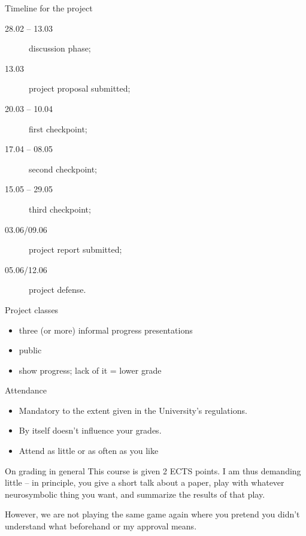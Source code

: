 \documentclass{lecture}
\begin{document}
\begin{frame}{Timeline for the project}
    \begin{description}
        \item[28.02 -- 13.03] discussion phase;
        \item[13.03] project proposal submitted;
        \item[20.03 -- 10.04] first checkpoint;
        \item[17.04 -- 08.05] second checkpoint; 
        \item[15.05 -- 29.05] third checkpoint;
        \item[03.06/09.06] project report submitted;
        \item[05.06/12.06] project defense.
    \end{description}
\end{frame}

\begin{frame}{Project classes}
    \begin{itemize}
        \item three (or more) informal progress presentations
        \item public
        \item show progress; lack of it = lower grade                        
    \end{itemize}    
\end{frame}

\begin{frame}{Attendance}
    \begin{itemize}
        \item Mandatory to the extent given in the University's regulations.
        \item By itself doesn't influence your grades.
        \item Attend as little or as often as you like
    \end{itemize}
\end{frame}

\begin{frame}{On grading in general}
    This course is given 2 ECTS points. I am thus demanding little -- in principle, you give a short talk about a paper, play with whatever neurosymbolic thing you want, and summarize the results of that play.

    However, we are not playing the same game again where you pretend you didn't understand what \alert{beforehand} or \alert{my approval} means.
\end{frame}
\end{document}
